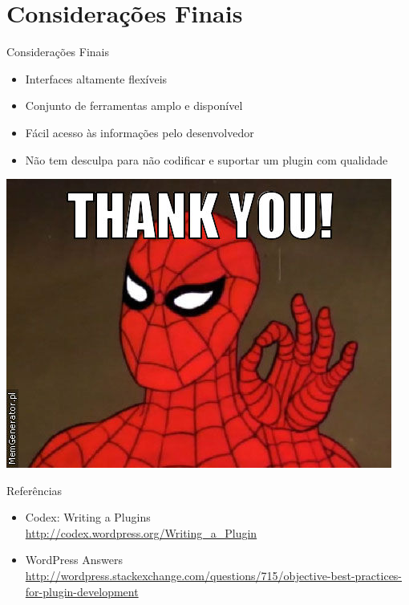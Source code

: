 \documentclass{beamer}
\begin{document}
\section{Considerações Finais}

\begin{frame}{Considerações Finais}
\begin{itemize}
  \pause \item Interfaces altamente flexíveis
  \pause \item Conjunto de ferramentas amplo e disponível
  \pause \item Fácil acesso às informações pelo desenvolvedor
  \pause \item Não tem desculpa para não codificar e suportar um
    plugin com qualidade
\end{itemize}
\end{frame}

\begin{frame}
\begin{center}
  \includegraphics[height=0.8\textheight]{./img/thank-you.jpg}
\end{center}
\end{frame}

\begin{frame}{Referências}
\begin{itemize}
  \item Codex: Writing a Plugins \\
    \url{http://codex.wordpress.org/Writing_a_Plugin}
  \item WordPress Answers
    \url{http://wordpress.stackexchange.com/questions/715/objective-best-practices-for-plugin-development}
\end{itemize}
\end{frame}
\end{document}
